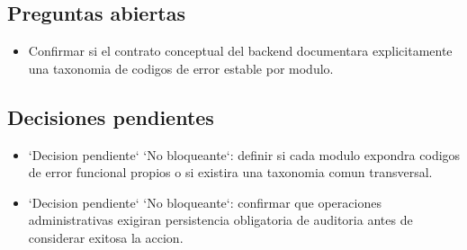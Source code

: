 \subsection{Preguntas abiertas}

\begin{itemize}
  \item Confirmar si el contrato conceptual del backend documentara explicitamente una taxonomia de codigos de error estable por modulo.
\end{itemize}

\subsection{Decisiones pendientes}

\begin{itemize}
  \item `Decision pendiente` `No bloqueante`: definir si cada modulo expondra codigos de error funcional propios o si existira una taxonomia comun transversal.
  \item `Decision pendiente` `No bloqueante`: confirmar que operaciones administrativas exigiran persistencia obligatoria de auditoria antes de considerar exitosa la accion.
\end{itemize}

